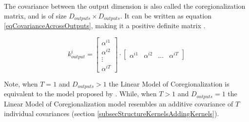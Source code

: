 The covariance between the output dimension  is also called the coregionalization matrix, and is of size $D_{outputs} \times D_{outputs}$. It can be written as equation \ref{eqCovarianceAcrossOutputs}, making it a positive definite matrix \cite{mercer1909functions}.

\begin{equation}\label{eqCovarianceAcrossOutputs}
k_{output}^{i} = \begin{bmatrix}
\alpha^{i1}\\ 
\alpha^{i2}\\ 
\vdots\\ 
\alpha^{iT}
\end{bmatrix} \cdot \begin{bmatrix}
\alpha^{i1} & \alpha^{i2} & \ldots & \alpha^{iT}
\end{bmatrix}
\end{equation}

Note, when $T = 1$ and $D_{outputs} > 1$ the Linear Model of Coregionalization is equivalent to the model proposed by \cite{bonilla2007multi}. While, when $T > 1$ and $D_{outputs} = 1$ the Linear Model of Coregionalization model resembles an additive covariance of $T$ individual covariances (section \ref{subsecStructureKernelsAddingKernels}).

